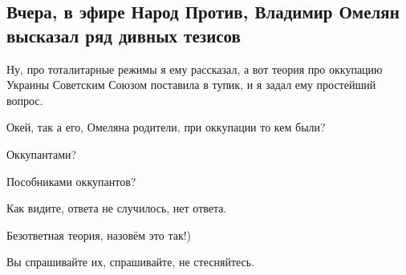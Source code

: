  
 
 
 
 
\subsection{Вчера, в эфире Народ Против, Владимир Омелян высказал ряд дивных тезисов}
\label{sec:07_05_2021.fb.1.buzhanskii_omeljan}

Ну, про тоталитарные режимы я ему рассказал, а вот теория про оккупацию Украины
Советским Союзом поставила в тупик, и я задал ему простейший вопрос.

Окей, так а его, Омеляна родители, при оккупации то кем были?

Оккупантами?

Пособниками оккупантов?

Как видите, ответа не случилось, нет ответа.

Безответная теория, назовём это так!)

Вы спрашивайте их, спрашивайте, не стесняйтесь.
